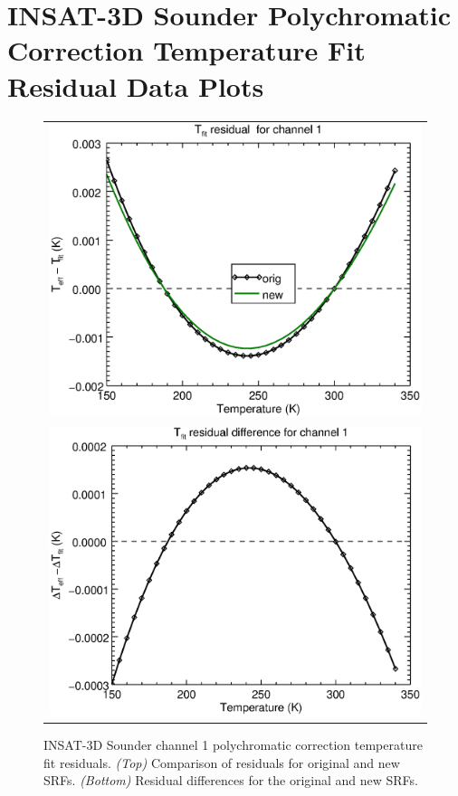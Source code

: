 \section{INSAT-3D Sounder Polychromatic Correction Temperature Fit Residual Data Plots}
\label{app.sndr_tfit_data_plots}

\begin{figure}[H]
  \centering
  \begin{tabular}{c}
    \includegraphics[scale=0.55]{graphics/sndr/tfit/sndr_insat3d-1.tfit.eps} \\
    \includegraphics[scale=0.55]{graphics/sndr/tfit/sndr_insat3d-1.tfit.difference.eps}
  \end{tabular}
  \caption{INSAT-3D Sounder channel 1 polychromatic correction temperature fit residuals. \emph{(Top)} Comparison of residuals for original and new SRFs. \emph{(Bottom)} Residual differences for the original and new SRFs.}
  \label{fig:sndr_ch1_tfit}
\end{figure}


